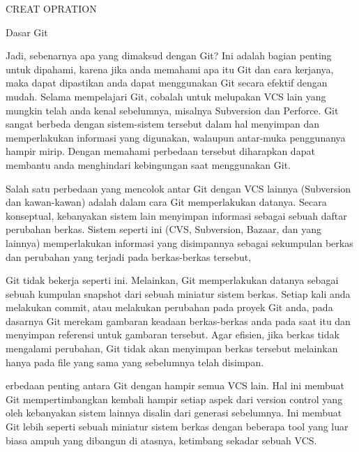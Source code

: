 
\sloppy
{\fontsize{14pt}{14pt}\selectfont CREAT OPRATION \\} \par
\vspace{14pt}
\noindent 
{\fontsize{14pt}{14pt}\selectfont Dasar Git \\} \par
\noindent 
{\fontsize{14pt}{14pt}\selectfont Jadi, sebenarnya apa yang dimaksud dengan Git? Ini adalah bagian penting untuk dipahami, karena jika anda memahami apa itu Git dan cara kerjanya, maka dapat dipastikan anda dapat menggunakan Git secara efektif dengan mudah. Selama mempelajari Git, cobalah untuk melupakan VCS lain yang mungkin telah anda kenal sebelumnya, misalnya Subversion dan Perforce. Git sangat berbeda dengan sistem-sistem tersebut dalam hal menyimpan dan memperlakukan informasi yang digunakan, walaupun antar-muka penggunanya hampir mirip. Dengan memahami perbedaan tersebut diharapkan dapat membantu anda menghindari kebingungan saat menggunakan Git. \\} \par

 \par
\noindent 
{\fontsize{14pt}{14pt}\selectfont Salah satu perbedaan yang mencolok antar Git dengan VCS lainnya (Subversion dan kawan-kawan) adalah dalam cara Git memperlakukan datanya. Secara konseptual, kebanyakan sistem lain menyimpan informasi sebagai sebuah daftar perubahan berkas. Sistem seperti ini (CVS, Subversion, Bazaar, dan yang lainnya) memperlakukan informasi yang disimpannya sebagai sekumpulan berkas dan perubahan yang terjadi pada berkas-berkas tersebut, \\} \par
\vspace{14pt}
\noindent 
{\fontsize{14pt}{14pt}\selectfont Git tidak bekerja seperti ini. Melainkan, Git memperlakukan datanya sebagai sebuah kumpulan snapshot dari sebuah miniatur sistem berkas. Setiap kali anda melakukan commit, atau melakukan perubahan pada proyek Git anda, pada dasarnya Git merekam gambaran keadaan berkas-berkas anda pada saat itu dan menyimpan referensi untuk gambaran tersebut. Agar efisien, jika berkas tidak mengalami perubahan, Git tidak akan menyimpan berkas tersebut melainkan hanya pada file yang sama yang sebelumnya telah disimpan. \\} \par
\vspace{14pt}
\noindent 
{\fontsize{14pt}{14pt}\selectfont erbedaan penting antara Git dengan hampir semua VCS lain. Hal ini membuat Git mempertimbangkan kembali hampir setiap aspek dari version control yang oleh kebanyakan sistem lainnya disalin dari generasi sebelumnya. Ini membuat Git lebih seperti sebuah miniatur sistem berkas dengan beberapa tool yang luar biasa ampuh yang dibangun di atasnya, ketimbang sekadar sebuah VCS. $  $ \\} \par

